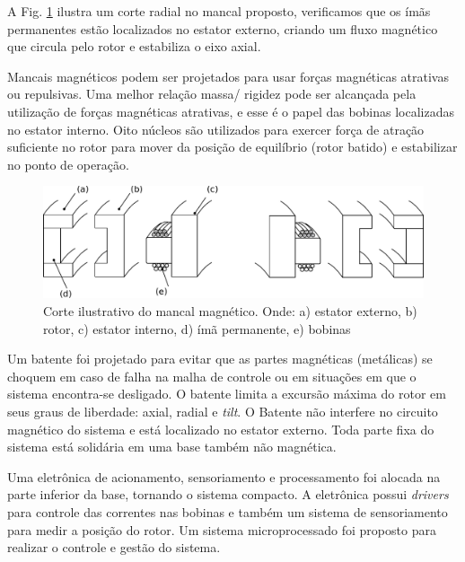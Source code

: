 A Fig. \ref{fig:mancal:corte} ilustra um corte radial no mancal proposto, verificamos que os ímãs permanentes estão localizados no estator externo, criando um fluxo magnético que circula pelo rotor e estabiliza o eixo axial.

Mancais magnéticos podem ser projetados para usar forças magnéticas atrativas ou repulsivas. Uma melhor relação massa/ rigidez pode ser alcançada pela utilização de forças magnéticas atrativas, e esse é o papel das bobinas localizadas no estator interno. Oito núcleos são utilizados para exercer força de atração suficiente no rotor para mover da posição de equilíbrio (rotor batido) e estabilizar no ponto de operação. 

\begin{figure}[ht!]
	\centering
	\includegraphics[width=1\linewidth]{./Figs/mancais/mancal_corte}
	\caption[Corte ilustrativo do mancal magnético]{Corte ilustrativo do mancal magnético. Onde: a) estator externo, b) rotor, c) estator interno, d) ímã permanente, e) bobinas}
	\label{fig:mancal:corte}
\end{figure}

Um batente foi projetado para evitar que as partes magnéticas (metálicas) se choquem em caso de falha na malha de controle ou em situações em que o sistema encontra-se desligado. O batente limita a excursão máxima do rotor em seus graus de liberdade: axial, radial e \textit{tilt}. O Batente não interfere no circuito magnético do sistema e está localizado no estator externo. Toda parte fixa do sistema está solidária em uma base também não magnética.

Uma eletrônica de acionamento, sensoriamento e processamento foi alocada na parte inferior da base, tornando o sistema compacto. A eletrônica possui \textit{drivers} para controle das correntes nas bobinas e também um sistema de sensoriamento para medir a posição do rotor. Um sistema microprocessado foi proposto para realizar o controle e gestão do sistema.

%

